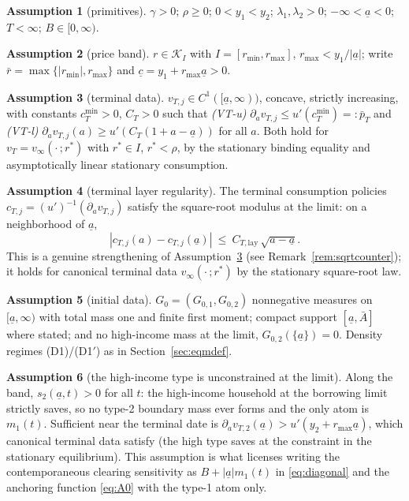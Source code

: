 \documentclass[11pt]{article}
\theoremstyle{definition}
\newtheorem{assumption}{Assumption}[section]
\theoremstyle{remark}
\newcommand{\ubar}[1]{\underline{#1}}
\newcommand{\Kcal}{\mathcal{K}}
\newcommand{\ubc}{\ubar{c}}
\newcommand{\uba}{\ubar{a}}
\begin{document}
\begin{assumption}[primitives]\label{ass:prim}
$\gamma>0$; $\rho\ge0$; $0<y_1<y_2$; $\lambda_1,\lambda_2>0$;
$-\infty<\uba<0$; $T<\infty$; $B\in[0,\infty)$.
\end{assumption}

\begin{assumption}[price band]\label{ass:band}
$r\in\Kcal_I$ with $I=[r_{\min},r_{\max}]$,
$r_{\max}<y_1/|\uba|$; write $\bar r=\max\{|r_{\min}|,r_{\max}\}$ and
$\ubc=y_1+r_{\max}\uba>0$.
\end{assumption}

\begin{assumption}[terminal data]\label{ass:VT}
$v_{T,j}\in C^1([\uba,\infty))$, concave, strictly increasing, with
constants $c_T^{\min}>0$, $C_T>0$ such that
\emph{(VT-u)} $\partial_a v_{T,j}\le u'(c_T^{\min})=:\bar p_T$ and
\emph{(VT-l)} $\partial_a v_{T,j}(a)\ge u'(C_T(1+a-\uba))$ for all
$a$. Both hold for $v_T=v_\infty(\cdot\,;r^*)$ with
$r^*\in I$, $r^*<\rho$, by the stationary binding equality and
asymptotically linear stationary consumption.
\end{assumption}

\begin{assumption}[terminal layer regularity]\label{ass:VTs}
The terminal consumption policies
$c_{T,j}=(u')^{-1}(\partial_a v_{T,j})$ satisfy the square-root
modulus at the limit: on a neighborhood of $\uba$,
\[
|c_{T,j}(a)-c_{T,j}(\uba)|\ \le\
C_{T,\mathrm{lay}}\,\sqrt{a-\uba}.
\] This is a genuine strengthening of
Assumption~\ref{ass:VT} (see Remark~\ref{rem:sqrtcounter}); it holds
for canonical terminal data $v_\infty(\cdot\,;r^*)$ by the stationary
square-root law.
\end{assumption}

\begin{assumption}[initial data]\label{ass:G0}
$G_0=(G_{0,1},G_{0,2})$ nonnegative measures on $[\uba,\infty)$ with
total mass one and finite first moment; compact support
$[\uba,\bar A]$ where stated; and no high-income mass at the limit,
$G_{0,2}(\{\uba\})=0$. Density regimes (D1)/(D1$'$) as in
Section~\ref{sec:eqmdef}.
\end{assumption}

\begin{assumption}[the high-income type is unconstrained at the
limit]\label{ass:type2}
Along the band, $s_2(\uba,t)>0$ for all $t$: the high-income
household at the borrowing limit strictly saves, so no type-2
boundary mass ever forms and the only atom is $m_1(t)$. Sufficient
near the terminal date is
$\partial_a v_{T,2}(\uba)>u'(y_2+r_{\max}\uba)$, which canonical
terminal data satisfy (the high type saves at the constraint in the
stationary equilibrium). This assumption is what licenses writing the
contemporaneous clearing sensitivity as $B+|\uba|m_1(t)$ in
\eqref{eq:diagonal} and the anchoring function \eqref{eq:A0} with the
type-1 atom only.
\end{assumption}
\end{document}

